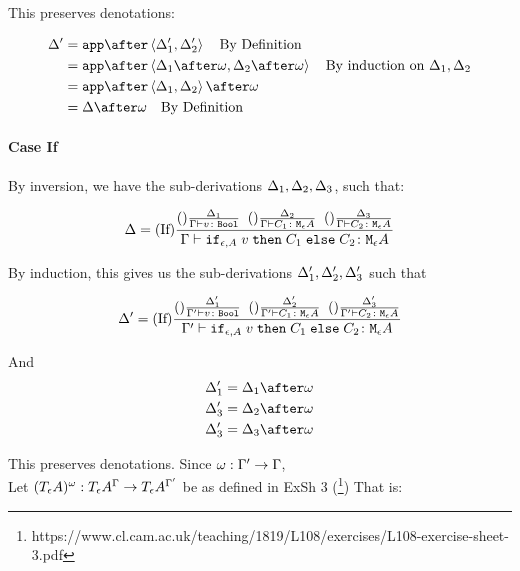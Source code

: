 \documentclass{report}
\begin{document}
        This preserves denotations:

        \begin{align}
            \D' &= \app\after\pr{\D_1'}{\D_2'} \qt{By Definition}\\
            &= \app\after\pr{\D_1\after\w}{\D_2\after\w} \qt{By induction on $\D_1, \D_2$}\\
            &= \app\after\pr{\D_1}{\D_2}\after\w\\
            &= \D\after\w\qt{By Definition}
        \end{align}
    \paragraph{Case If}
    By inversion, we have the sub-derivations $\Delta_1,\Delta_2,\Delta_3$, such that:


    \begin{equation}
        \Delta = (\text{If}) \frac{
            (\text{}) \frac{\Delta_1}{\Gamma \vdash v \colon \texttt{Bool}}
            \;\;
            (\text{}) \frac{\Delta_2}{\Gamma \vdash C_1 \colon \texttt{M}_{\epsilon}{A}}
            \;\;
            (\text{}) \frac{\Delta_3}{\Gamma \vdash C_2 \colon \texttt{M}_{\epsilon}{A}}
        }{
            \Gamma \vdash \texttt{if}_{\epsilon, A}\; v\; \texttt{then}\; C_1 \;\texttt{else} \; C_2 \colon \texttt{M}_{\epsilon}{A}
        }
    \end{equation}

    By induction, this gives us the sub-derivations $\Delta_1', \Delta_2', \Delta_3'$ such that

    \begin{equation}
        \Delta' = (\text{If}) \frac{
            (\text{}) \frac{\Delta_1'}{\Gamma' \vdash v \colon \texttt{Bool}}
            \;\;
            (\text{}) \frac{\Delta_2'}{\Gamma' \vdash C_1 \colon \texttt{M}_{\epsilon}{A}}
            \;\;
            (\text{}) \frac{\Delta_3'}{\Gamma' \vdash C_2 \colon \texttt{M}_{\epsilon}{A}}
        }{
            \Gamma' \vdash \texttt{if}_{\epsilon, A}\; v\; \texttt{then}\; C_1 \;\texttt{else} \; C_2 \colon \texttt{M}_{\epsilon}{A}
        }
    \end{equation}

    And 
    \begin{align}
        \D_1' & =\D_1 \after \w\\
        \D_3' & =\D_2 \after \w\\
        \D_3' & =\D_3 \after \w 
    \end{align}


    This preserves denotations.
    Since $\omega: \Gamma' \rightarrow \Gamma$, \\
    Let $(T_{\epsilon}{A})^{\omega}: T_{\epsilon}{A}^{\Gamma}\rightarrow T_{\epsilon}{A}^{\Gamma'}$ be as defined in ExSh 3 (\footnote{https://www.cl.cam.ac.uk/teaching/1819/L108/exercises/L108-exercise-sheet-3.pdf})
    That is:
\end{document}

